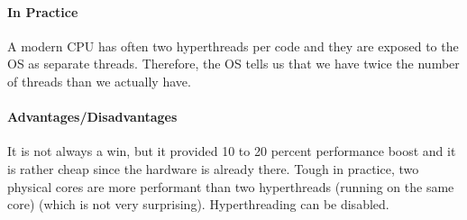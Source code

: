 \paragraph{In Practice}
A modern CPU has often two hyperthreads per code and they are exposed to the OS as separate threads. Therefore, the OS tells us that we have twice the number of threads than we actually have.

\paragraph{Advantages/Disadvantages}
It is not always a win, but it provided 10 to 20 percent performance boost and it is rather cheap since the hardware is already there. Tough in practice, two physical cores are more performant than two hyperthreads (running on the same core) (which is not very surprising). Hyperthreading can be disabled.
